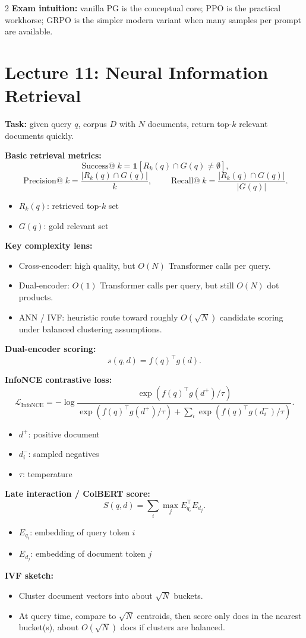 \documentclass[10pt]{article}
\newcommand{\InfoNCE}{\operatorname{InfoNCE}}
\newenvironment{symdefs}{\begin{itemize}[leftmargin=1.1em, topsep=1pt, itemsep=0pt, parsep=0pt]}{\end{itemize}}
\newcommand{\sym}[2]{\item \textbf{#1}: #2}
\begin{document}
\begin{multicols*}{2}
\textbf{Exam intuition:} vanilla PG is the conceptual core; PPO is the practical workhorse; GRPO is the simpler modern variant when many samples per prompt are available.

\section*{Lecture 11: Neural Information Retrieval}
\textbf{Task:} given query \(q\), corpus \(D\) with \(N\) documents, return top-\(k\) relevant documents quickly.

\textbf{Basic retrieval metrics:}
\[
\operatorname{Success@}k
=
\mathbf{1}[R_k(q)\cap G(q)\neq \emptyset],
\]
\[
\operatorname{Precision@}k
=
\frac{|R_k(q)\cap G(q)|}{k},
\qquad
\operatorname{Recall@}k
=
\frac{|R_k(q)\cap G(q)|}{|G(q)|}.
\]
\begin{symdefs}
\sym{\(R_k(q)\)}{retrieved top-\(k\) set}
\sym{\(G(q)\)}{gold relevant set}
\end{symdefs}

\textbf{Key complexity lens:}
\begin{itemize}
\item Cross-encoder: high quality, but \(O(N)\) Transformer calls per query.
\item Dual-encoder: \(O(1)\) Transformer calls per query, but still \(O(N)\) dot products.
\item ANN / IVF: heuristic route toward roughly \(O(\sqrt{N})\) candidate scoring under balanced clustering assumptions.
\end{itemize}

\textbf{Dual-encoder scoring:}
\[
s(q,d)=f(q)^{\top}g(d).
\]

\textbf{InfoNCE contrastive loss:}
\[
\mathcal{L}_{\InfoNCE}
=
-\log
\frac{
\exp(f(q)^{\top}g(d^+)/\tau)
}{
\exp(f(q)^{\top}g(d^+)/\tau)
+\sum_i \exp(f(q)^{\top}g(d_i^-)/\tau)
}.
\]
\begin{symdefs}
\sym{\(d^+\)}{positive document}
\sym{\(d_i^-\)}{sampled negatives}
\sym{\(\tau\)}{temperature}
\end{symdefs}

\textbf{Late interaction / ColBERT score:}
\[
S(q,d)=\sum_i \max_j E_{q_i}^{\top} E_{d_j}.
\]
\begin{symdefs}
\sym{\(E_{q_i}\)}{embedding of query token \(i\)}
\sym{\(E_{d_j}\)}{embedding of document token \(j\)}
\end{symdefs}

\textbf{IVF sketch:}
\begin{itemize}
\item Cluster document vectors into about \(\sqrt{N}\) buckets.
\item At query time, compare to \(\sqrt{N}\) centroids, then score only docs in the nearest bucket(s), about \(O(\sqrt{N})\) docs if clusters are balanced.
\end{itemize}


\end{multicols*}
\end{document}
